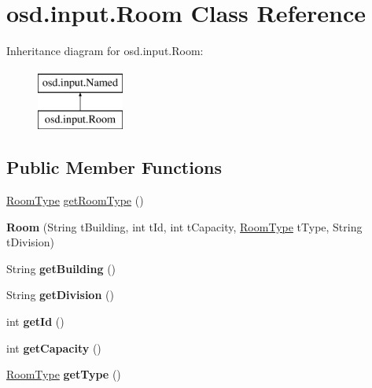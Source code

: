 \hypertarget{interfaceosd_1_1input_1_1_room}{\section{osd.\-input.\-Room Class Reference}
\label{interfaceosd_1_1input_1_1_room}
}
Inheritance diagram for osd.\-input.\-Room\-:\begin{figure}[H]
\begin{center}
\leavevmode
\includegraphics[height=2.000000cm]{interfaceosd_1_1input_1_1_room}
\end{center}
\end{figure}
\subsection*{Public Member Functions}
\begin{DoxyCompactItemize}
\item 
\hyperlink{interfaceosd_1_1input_1_1_room_type}{Room\-Type} \hyperlink{interfaceosd_1_1input_1_1_room_a45d616a99e600cd98fe09b7e654c1c71}{get\-Room\-Type} ()
\item 
\hypertarget{interfaceosd_1_1input_1_1_room_aff0170cca05e192a8d9d945d9c82f37c}{{\bfseries Room} (String t\-Building, int t\-Id, int t\-Capacity, \hyperlink{interfaceosd_1_1input_1_1_room_type}{Room\-Type} t\-Type, String t\-Division)}\label{interfaceosd_1_1input_1_1_room_aff0170cca05e192a8d9d945d9c82f37c}

\item 
\hypertarget{interfaceosd_1_1input_1_1_room_a1b6f1058bdfd643b5d457afdaee02b39}{String {\bfseries get\-Building} ()}\label{interfaceosd_1_1input_1_1_room_a1b6f1058bdfd643b5d457afdaee02b39}

\item 
\hypertarget{interfaceosd_1_1input_1_1_room_a3a1d32300a7e7224ff3b7a074a6d4f83}{String {\bfseries get\-Division} ()}\label{interfaceosd_1_1input_1_1_room_a3a1d32300a7e7224ff3b7a074a6d4f83}

\item 
\hypertarget{interfaceosd_1_1input_1_1_room_a9f436bfe04f749313d91c6be630d4df3}{int {\bfseries get\-Id} ()}\label{interfaceosd_1_1input_1_1_room_a9f436bfe04f749313d91c6be630d4df3}

\item 
\hypertarget{interfaceosd_1_1input_1_1_room_af906f320894f60f4f7fceb39bd85c3ba}{int {\bfseries get\-Capacity} ()}\label{interfaceosd_1_1input_1_1_room_af906f320894f60f4f7fceb39bd85c3ba}

\item 
\hypertarget{interfaceosd_1_1input_1_1_room_ae1888e550649197b473e98c38713ee53}{\hyperlink{interfaceosd_1_1input_1_1_room_type}{Room\-Type} {\bfseries get\-Type} ()}\label{interfaceosd_1_1input_1_1_room_ae1888e550649197b473e98c38713ee53}

\end{DoxyCompactItemize}


